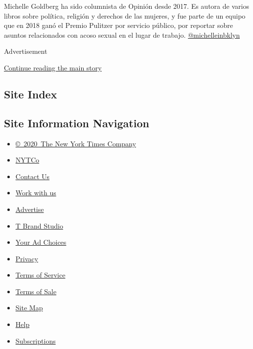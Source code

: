Michelle Goldberg ha sido columnista de Opinión desde 2017. Es autora de
varios libros sobre política, religión y derechos de las mujeres, y fue
parte de un equipo que en 2018 ganó el Premio Pulitzer por servicio
público, por reportar sobre asuntos relacionados con acoso sexual en el
lugar de trabajo.
\href{https://twitter.com/michelleinbklyn}{@michelleinbklyn}

Advertisement

\protect\hyperlink{after-bottom}{Continue reading the main story}

\hypertarget{site-index}{%
\subsection{Site Index}\label{site-index}}

\hypertarget{site-information-navigation}{%
\subsection{Site Information
Navigation}\label{site-information-navigation}}

\begin{itemize}
\tightlist
\item
  \href{https://help.nytimes.com/hc/en-us/articles/115014792127-Copyright-notice}{©~2020~The
  New York Times Company}
\end{itemize}

\begin{itemize}
\tightlist
\item
  \href{https://www.nytco.com/}{NYTCo}
\item
  \href{https://help.nytimes.com/hc/en-us/articles/115015385887-Contact-Us}{Contact
  Us}
\item
  \href{https://www.nytco.com/careers/}{Work with us}
\item
  \href{https://nytmediakit.com/}{Advertise}
\item
  \href{http://www.tbrandstudio.com/}{T Brand Studio}
\item
  \href{https://www.nytimes.com/privacy/cookie-policy\#how-do-i-manage-trackers}{Your
  Ad Choices}
\item
  \href{https://www.nytimes.com/privacy}{Privacy}
\item
  \href{https://help.nytimes.com/hc/en-us/articles/115014893428-Terms-of-service}{Terms
  of Service}
\item
  \href{https://help.nytimes.com/hc/en-us/articles/115014893968-Terms-of-sale}{Terms
  of Sale}
\item
  \href{https://spiderbites.nytimes.com}{Site Map}
\item
  \href{https://help.nytimes.com/hc/en-us}{Help}
\item
  \href{https://www.nytimes.com/subscription?campaignId=37WXW}{Subscriptions}
\end{itemize}
